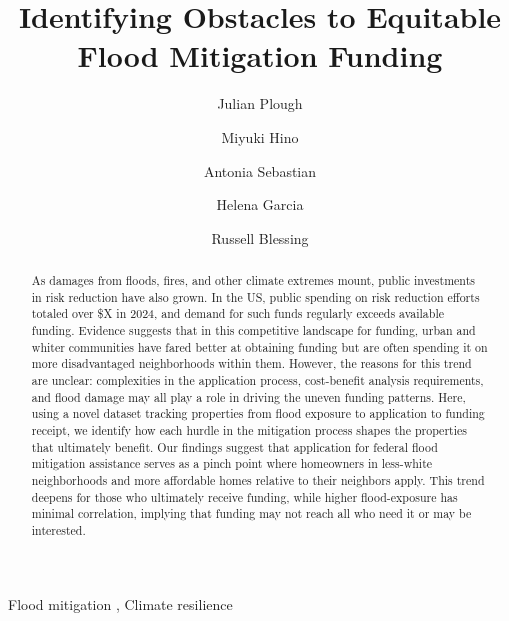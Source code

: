 \documentclass[
  authoryear,
  preprint]{elsarticle}
\begin{document}
\begin{frontmatter}
\title{Identifying Obstacles to Equitable Flood Mitigation Funding}
\author[2]{Julian Plough%
%
}

\author[1,2]{Miyuki Hino%
%
}

\author[1,2]{Antonia Sebastian%
%
}

\author[2]{Helena Garcia%
%
}

\author[1]{Russell Blessing%
%
}








        
\begin{abstract}
As damages from floods, fires, and other climate extremes mount, public
investments in risk reduction have also grown. In the US, public
spending on risk reduction efforts totaled over \$X in 2024, and demand
for such funds regularly exceeds available funding. Evidence suggests
that in this competitive landscape for funding, urban and whiter
communities have fared better at obtaining funding but are often
spending it on more disadvantaged neighborhoods within them. However,
the reasons for this trend are unclear: complexities in the application
process, cost-benefit analysis requirements, and flood damage may all
play a role in driving the uneven funding patterns. Here, using a novel
dataset tracking properties from flood exposure to application to
funding receipt, we identify how each hurdle in the mitigation process
shapes the properties that ultimately benefit. Our findings suggest that
application for federal flood mitigation assistance serves as a pinch
point where homeowners in less-white neighborhoods and more affordable
homes relative to their neighbors apply. This trend deepens for those
who ultimately receive funding, while higher flood-exposure has minimal
correlation, implying that funding may not reach all who need it or may
be interested.
\end{abstract}





\begin{keyword}
    Flood mitigation \sep 
    Climate resilience
\end{keyword}
\end{frontmatter}
    
\end{document}
